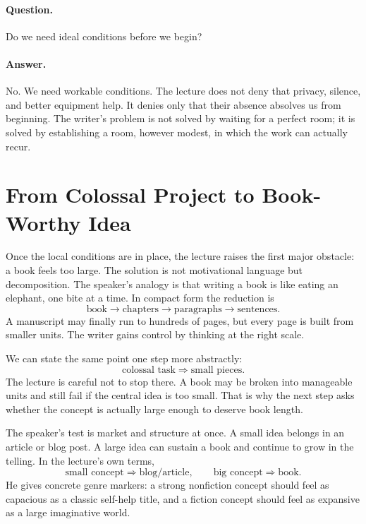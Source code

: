 \paragraph{Question.} Do we need ideal conditions before we begin?

\paragraph{Answer.} No. We need workable conditions. The lecture does not deny that privacy, silence, and better equipment help. It denies only that their absence absolves us from beginning. The writer's problem is not solved by waiting for a perfect room; it is solved by establishing a room, however modest, in which the work can actually recur.

\section{From Colossal Project to Book-Worthy Idea}

Once the local conditions are in place, the lecture raises the first major obstacle: a book feels too large. The solution is not motivational language but decomposition. The speaker's analogy is that writing a book is like eating an elephant, one bite at a time. In compact form the reduction is
\begin{equation}
\text{book} \to \text{chapters} \to \text{paragraphs} \to \text{sentences}.
\end{equation}
A manuscript may finally run to hundreds of pages, but every page is built from smaller units. The writer gains control by thinking at the right scale.

We can state the same point one step more abstractly:
\begin{equation}
\text{colossal task} \Rightarrow \text{small pieces}.
\end{equation}
The lecture is careful not to stop there. A book may be broken into manageable units and still fail if the central idea is too small. That is why the next step asks whether the concept is actually large enough to deserve book length.

The speaker's test is market and structure at once. A small idea belongs in an article or blog post. A large idea can sustain a book and continue to grow in the telling. In the lecture's own terms,
\begin{equation}
\text{small concept} \Rightarrow \text{blog/article}, \qquad
\text{big concept} \Rightarrow \text{book}.
\end{equation}
He gives concrete genre markers: a strong nonfiction concept should feel as capacious as a classic self-help title, and a fiction concept should feel as expansive as a large imaginative world.

